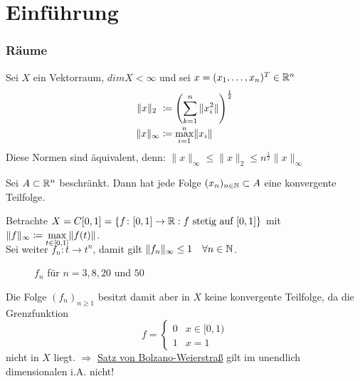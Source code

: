 \chapter*{Einf{\"u}hrung} 
  

\setcounter{section}{1}


\subsection*{R{\"a}ume}


Sei $X$ ein Vektorraum, $dim X < \infty $ und sei $x = (x_{1},\dotsc,x_{n})^{T} \in \mathbb{R}^{n}$
\begin{align*}
	\|x\|_{2}~ & \coloneqq \left(\sum_{k = 1}^{n} \|x_{i}^{2}\| \right)^{\frac{1}{2}}\\
	\|x\|_{\infty} & \coloneqq \smash{\displaystyle\max_{i = 1}^{n}}  \|x_{i}\|	
\end{align*}	

Diese Normen sind äquivalent, denn:
$\| x \|_{\infty} \leq \| x \|_{2} \leq n^{\frac{1}{2}} \| x \|_{\infty}$ 

\begin{satz}  \label{satz:1.1-BolzanoWeierstrass}
Sei $A \subset \mathbb{R}^{n}$ beschränkt. Dann hat jede Folge $(x_{n})_{n \in \mathbb{N}} \subset A$ eine konvergente Teilfolge.
\end{satz}


\begin{beispiel}
	Betrachte $X = C[0, 1] = \{ f \colon [0, 1] \rightarrow \mathbb{R}: f \text{ stetig auf } [0, 1] \} $ mit $\| f \|_{\infty} \coloneqq  \smash{\displaystyle\max_{t \in [0, 1]}}  \| f(t) \|$. \\ 
	Sei weiter $f_{n} \colon t \rightarrow t^{n}$, damit gilt $\| f_{n} \|_{\infty} \leq 1 \quad \forall n \in \mathbb{N}$.	
	\begin{figure}[H]	
		\begin{center}					
			\caption{$f_{n}$ für $n = 3, 8, 20$ und $50$}
		\end{center}
	\end{figure}					
	Die Folge $(f_{n})_{n \geq 1}$ besitzt damit aber in $X$ keine konvergente Teilfolge, da die Grenzfunktion
		\[ f = \begin{cases} 0 & x \in [0, 1) \\ 1 & x = 1 \end{cases} \]
	nicht in $X$ liegt. $ \Rightarrow $ \hyperref[satz:1.1-BolzanoWeierstrass]{Satz von Bolzano-Weierstra{\ss}} gilt im unendlich dimensionalen i.A. nicht!
\end{beispiel}


